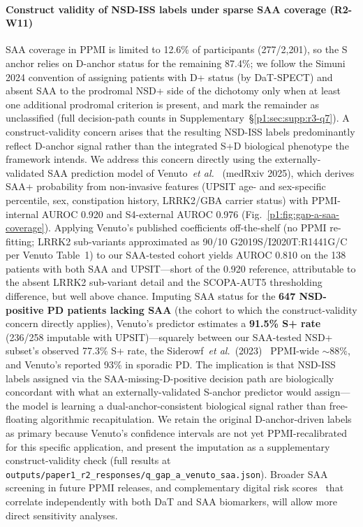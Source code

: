 \paragraph*{Construct validity of NSD-ISS labels under sparse SAA coverage (R2-W11)} SAA coverage in PPMI is limited to 12.6\% of participants (277/2{,}201), so the S anchor relies on D-anchor status for the remaining 87.4\%; we follow the Simuni 2024 convention of assigning patients with D+ status (by DaT-SPECT) and absent SAA to the prodromal NSD+ side of the dichotomy only when at least one additional prodromal criterion is present, and mark the remainder as unclassified (full decision-path counts in Supplementary~\S\ref{p1:sec:supp:r3-q7}). A construct-validity concern arises that the resulting NSD-ISS labels predominantly reflect D-anchor signal rather than the integrated S+D biological phenotype the framework intends. We address this concern directly using the externally-validated SAA prediction model of Venuto~\textit{et al.}~\cite{venuto2025saa} (medRxiv 2025), which derives SAA+ probability from non-invasive features (UPSIT age- and sex-specific percentile, sex, constipation history, LRRK2/GBA carrier status) with PPMI-internal AUROC 0.920 and S4-external AUROC 0.976 (Fig.~\ref{p1:fig:gap-a-saa-coverage}). Applying Venuto's published coefficients off-the-shelf (no PPMI re-fitting; LRRK2 sub-variants approximated as 90/10 G2019S/I2020T:R1441G/C per Venuto Table~1) to our SAA-tested cohort yields AUROC 0.810 on the 138 patients with both SAA and UPSIT---short of the 0.920 reference, attributable to the absent LRRK2 sub-variant detail and the SCOPA-AUT5 thresholding difference, but well above chance. Imputing SAA status for the \textbf{647 NSD-positive PD patients lacking SAA} (the cohort to which the construct-validity concern directly applies), Venuto's predictor estimates a \textbf{91.5\% S+ rate} (236/258 imputable with UPSIT)---squarely between our SAA-tested NSD+ subset's observed 77.3\% S+ rate, the Siderowf~\textit{et al.}~(2023)~\cite{siderowf2023} PPMI-wide ${\sim}88\%$, and Venuto's reported 93\% in sporadic PD. The implication is that NSD-ISS labels assigned via the SAA-missing-D-positive decision path are biologically concordant with what an externally-validated S-anchor predictor would assign---the model is learning a dual-anchor-consistent biological signal rather than free-floating algorithmic recapitulation. We retain the original D-anchor-driven labels as primary because Venuto's confidence intervals are not yet PPMI-recalibrated for this specific application, and present the imputation as a supplementary construct-validity check (full results at \texttt{outputs/paper1\_r2\_responses/q\_gap\_a\_venuto\_saa.json}). Broader SAA screening in future PPMI releases, and complementary digital risk scores~\cite{schalkamp2025wearables} that correlate independently with both DaT and SAA biomarkers, will allow more direct sensitivity analyses.


